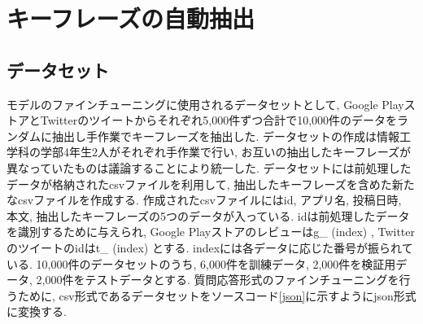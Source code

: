 
\section{キーフレーズの自動抽出}\label{extraction}
\subsection{データセット}\label{dataset}
モデルのファインチューニングに使用されるデータセットとして, Google PlayストアとTwitterのツイートからそれぞれ5,000件ずつ合計で10,000件のデータをランダムに抽出し手作業でキーフレーズを抽出した. データセットの作成は情報工学科の学部4年生2人がそれぞれ手作業で行い, お互いの抽出したキーフレーズが異なっていたものは議論することにより統一した. 
データセットには前処理したデータが格納されたcsvファイルを利用して, 抽出したキーフレーズを含めた新たなcsvファイルを作成する. 作成されたcsvファイルにはid, アプリ名, 投稿日時, 本文, 抽出したキーフレーズの5つのデータが入っている. idは前処理したデータを識別するために与えられ, Google Playストアのレビューはg\_ (index) , Twitterのツイートのidはt\_ (index) とする.  indexには各データに応じた番号が振られている. 
10,000件のデータセットのうち, 6,000件を訓練データ, 2,000件を検証用データ, 2,000件をテストデータとする. 質問応答形式のファインチューニングを行うために, csv形式であるデータセットをソースコード\ref{json}に示すようにjson形式に変換する. 

